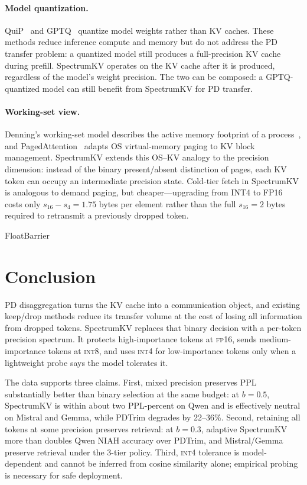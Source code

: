 \documentclass[11pt]{article}
\newcommand{\method}{SpectrumKV}
\newcommand{\niah}{NIAH}
\newcommand{\budget}{b}
\newcommand{\pct}{\%}
\newcommand{\fp}{\textsc{fp16}}
\newcommand{\intviii}{\textsc{int8}}
\newcommand{\intiv}{\textsc{int4}}
\theoremstyle{plain}
\theoremstyle{definition}
\begin{document}
\paragraph{Model quantization.}
QuiP~\citep{quip} and GPTQ~\citep{gptq} quantize model weights rather than KV caches.  These methods reduce inference compute and memory but do not address the PD transfer problem: a quantized model still produces a full-precision KV cache during prefill.  \method{} operates on the KV cache after it is produced, regardless of the model's weight precision.  The two can be composed: a GPTQ-quantized model can still benefit from \method{} for PD transfer.

\paragraph{Working-set view.}
Denning's working-set model describes the active memory footprint of a process~\citep{denning1968working}, and PagedAttention~\citep{pagedattention} adapts OS virtual-memory paging to KV block management.  \method{} extends this OS--KV analogy to the precision dimension: instead of the binary present/absent distinction of pages, each KV token can occupy an intermediate precision state.  Cold-tier fetch in \method{} is analogous to demand paging, but cheaper---upgrading from INT4 to FP16 costs only $s_{16}-s_4=1.75$ bytes per element rather than the full $s_{16}=2$ bytes required to retransmit a previously dropped token.

FloatBarrier
\section{Conclusion}
\label{sec:conclusion}

PD disaggregation turns the KV cache into a communication object, and existing keep/drop methods reduce its transfer volume at the cost of losing all information from dropped tokens.  \method{} replaces that binary decision with a per-token precision spectrum.  It protects high-importance tokens at \fp{}, sends medium-importance tokens at \intviii{}, and uses \intiv{} for low-importance tokens only when a lightweight probe says the model tolerates it.

The data supports three claims.  First, mixed precision preserves PPL substantially better than binary selection at the same budget: at $\budget=0.5$, \method{} is within about two PPL-percent on Qwen and is effectively neutral on Mistral and Gemma, while PDTrim degrades by 22--36\pct{}.  Second, retaining all tokens at some precision preserves retrieval: at $\budget=0.3$, adaptive \method{} more than doubles Qwen \niah{} accuracy over PDTrim, and Mistral/Gemma preserve retrieval under the 3-tier policy.  Third, \intiv{} tolerance is model-dependent and cannot be inferred from cosine similarity alone; empirical probing is necessary for safe deployment.
\end{document}
